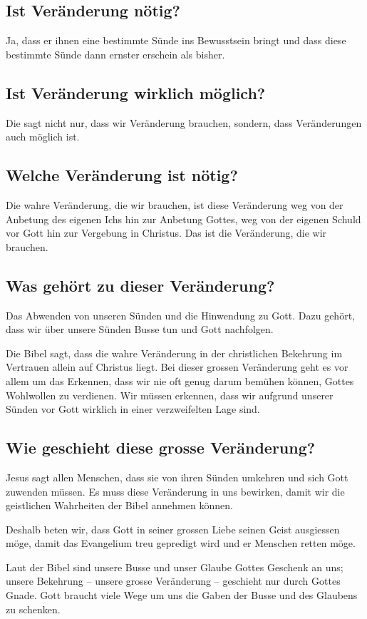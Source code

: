 \documentclass{../../inc/mybib}
\begin{document}
\subsection{Ist Veränderung nötig? }
Ja, dass er ihnen eine bestimmte Sünde ins Bewusstsein bringt und dass diese bestimmte Sünde dann ernster erschein als bisher.
\subsection{Ist Veränderung wirklich möglich? }
Die sagt nicht nur, dass wir Veränderung brauchen, sondern, dass Veränderungen auch möglich ist.
\subsection{Welche Veränderung ist nötig? }
Die wahre Veränderung, die wir brauchen, ist diese Veränderung weg von der Anbetung des eigenen Ichs hin zur Anbetung Gottes, weg von der eigenen Schuld vor Gott hin zur Vergebung in Christus. Das ist die Veränderung, die wir brauchen.
\subsection{Was gehört zu dieser Veränderung? }
Das Abwenden von unseren Sünden und die Hinwendung zu Gott. Dazu gehört, dass wir über unsere Sünden Busse tun und Gott nachfolgen.

Die Bibel sagt, dass die wahre Veränderung in der christlichen Bekehrung im Vertrauen allein auf Christus liegt. Bei dieser grossen Veränderung geht es vor allem um das Erkennen, dass wir nie oft genug darum bemühen können, Gottes Wohlwollen zu verdienen. Wir müssen erkennen, dass wir aufgrund unserer Sünden vor Gott wirklich in einer verzweifelten Lage sind.
\subsection{Wie geschieht diese grosse Veränderung? }
Jesus sagt allen Menschen, dass sie von ihren Sünden umkehren und sich Gott zuwenden müssen. Es muss diese Veränderung in uns bewirken, damit wir die geistlichen Wahrheiten der Bibel annehmen können.

Deshalb beten wir, dass Gott in seiner grossen Liebe seinen Geist ausgiessen möge, damit das Evangelium treu gepredigt wird und er Menschen retten möge.

Laut der Bibel sind unsere Busse und unser Glaube Gottes Geschenk an uns; unsere Bekehrung -- unsere grosse Veränderung -- geschieht nur durch Gottes Gnade. Gott braucht viele Wege um uns die Gaben der Busse und des Glaubens zu schenken.
\end{document}
